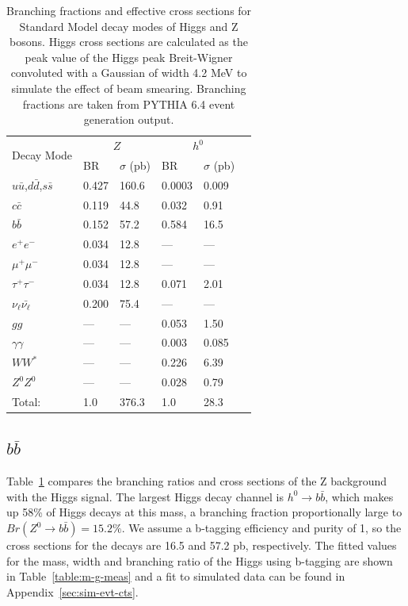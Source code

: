 \documentclass[a4paper]{article}
\begin{document}
\begin{table}
	\begin{center}
		\begin{tabular}{|l|l|l|l|l|l|}
			\hline
			\multirow{2}{*}{Decay Mode} & \multicolumn{2}{|c|}{$Z$} & \multicolumn{2}{|c|}{$h^0$} \\ \cline{2-5}
			& BR & $\sigma$ (pb) & BR & $\sigma$ (pb) \\ 
			\hline
			$u\bar{u}$,$d\bar{d}$,$s\bar{s}$ & 0.427 & 160.6 & 0.0003 & 0.009 \\ \hline
			$c\bar{c}$      & 0.119 & 44.8 & 0.032 & 0.91 \\ \hline
			$b\bar{b}$      & 0.152 & 57.2 & 0.584 & 16.5 \\ \hline
			$e^+e^-$        & 0.034 & 12.8 & --- & --- \\ \hline
			$\mu^+\mu^-$    & 0.034 & 12.8 & --- & --- \\ \hline
			$\tau^+\tau^-$  & 0.034 & 12.8 & 0.071 & 2.01 \\ \hline
			$\nu_{\ell}\bar{\nu_{\ell}}$    & 0.200 & 75.4  & --- & --- \\ \hline
			$gg$                    & ---   & ---   & 0.053 & 1.50 \\ \hline
			$\gamma\gamma$  & ---   & ---   & 0.003 & 0.085 \\ \hline
			$WW^*$                  & ---   & ---   & 0.226 & 6.39 \\ \hline
			$Z^0Z^0$                & ---   & ---   & 0.028 & 0.79 \\
			\hline \hline
			Total:  & 1.0 & 376.3 & 1.0 & 28.3 \\ \hline
		\end{tabular}
	\end{center}
	\caption{Branching fractions and effective cross sections for Standard Model decay modes of Higgs and Z bosons. Higgs cross sections are calculated as the peak value of the Higgs peak Breit-Wigner convoluted with a Gaussian of width 4.2 MeV to simulate the effect of beam smearing. Branching fractions are taken from PYTHIA 6.4 event generation output.\label{bfs-xsects}}
\end{table}

	\subsection{$b\bar{b}$}
	Table~\ref{bfs-xsects} compares the branching ratios and cross sections of the Z background with the Higgs signal. The largest Higgs decay channel is $h^0\rightarrow b\bar{b}$, which makes up 58\% of Higgs decays at this mass, a branching fraction proportionally large to $Br(Z^0\rightarrow b\bar{b}) = 15.2\%$. We assume a b-tagging efficiency and purity of 1, so the cross sections for the decays are 16.5 and 57.2 pb, respectively. The fitted values for the mass, width and branching ratio of the Higgs using b-tagging are shown in Table~\ref{table:m-g-meas} and a fit to simulated data can be found in Appendix~\ref{sec:sim-evt-cts}.
\end{document}
